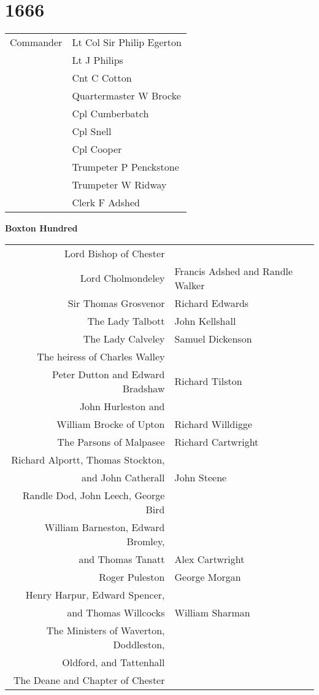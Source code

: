 \chapter*{1666}

\begin{center}
  \begin{tabular}{rl}
    Commander & Lt Col Sir Philip Egerton \\
    & Lt J Philips \\
    & Cnt C Cotton \\
    & Quartermaster W Brocke \\
    & Cpl Cumberbatch \\
    & Cpl Snell \\
    & Cpl Cooper \\
    & Trumpeter P Penckstone \\
    & Trumpeter W Ridway \\
    & Clerk F Adshed \\
  \end{tabular}
\end{center}

\begin{center}
  \Large
  \textbf{Boxton Hundred}
\end{center}

\begin{center}
  \small
  \begin{tabular}{rl}
    Lord Bishop of Chester & \dotfill \\
    Lord Cholmondeley & Francis Adshed and Randle Walker \\
    Sir Thomas Grosvenor & Richard Edwards \\
    The Lady Talbott & John Kellshall \\
    The Lady Calveley & Samuel Dickenson \\
    The heiress of Charles Walley & \dotfill \\
    Peter Dutton and Edward Bradshaw & Richard Tilston \\
    John Hurleston and \\ William Brocke of Upton & Richard Willdigge \\
    The Parsons of Malpasee & Richard Cartwright \\
    Richard Alportt, Thomas Stockton, \\ and John Catherall & John Steene \\
    Randle Dod, John Leech, George Bird & \\
    William Barneston, Edward Bromley, \\ and Thomas Tanatt & Alex Cartwright \\
    Roger Puleston & George Morgan \\
    Henry Harpur, Edward Spencer, \\ and Thomas Willcocks & William Sharman \\
    The Ministers of Waverton, Doddleston, \\ Oldford, and Tattenhall & \dotfill \\
    The Deane and Chapter of Chester & \dotfill \\
  \end{tabular}
\end{center}

